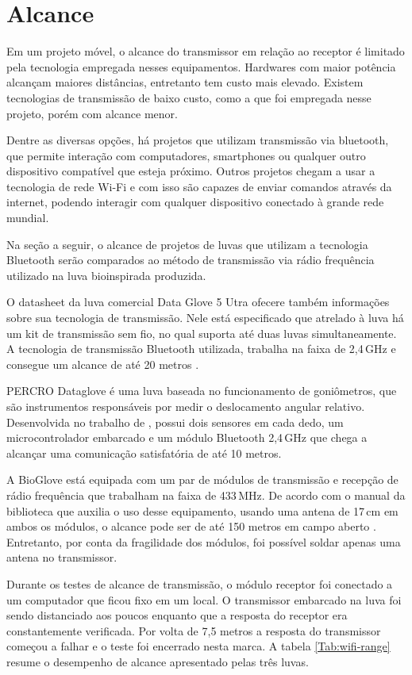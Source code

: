 \documentclass[
	12pt,				%
	openright,			%
	oneside,			%
	a4paper,			%
	english,			%
	brazil				%
	]{abntex2}
\begin{document}
			\section{Alcance}

			Em um projeto móvel, o alcance do transmissor em relação ao receptor é limitado pela tecnologia empregada nesses equipamentos. Hardwares com maior potência alcançam maiores distâncias, entretanto tem custo mais elevado. Existem tecnologias de transmissão de baixo custo, como a que foi empregada nesse projeto, porém com alcance menor. 
			
			Dentre as diversas opções, há projetos que utilizam transmissão via bluetooth, que permite interação com computadores, smartphones ou qualquer outro dispositivo compatível que esteja próximo. Outros projetos chegam a usar a tecnologia de rede Wi-Fi e com isso são capazes de enviar comandos através da internet, podendo interagir com qualquer dispositivo conectado à grande rede mundial. 

			Na seção a seguir, o alcance de projetos de luvas que utilizam a tecnologia Bluetooth serão comparados ao método de transmissão via rádio frequência utilizado na luva bioinspirada produzida.

			O datasheet da luva comercial Data Glove 5 Utra ofecere também informações sobre sua tecnologia de transmissão. Nele está especificado que atrelado à luva há um kit de transmissão sem fio, no qual suporta até duas luvas simultaneamente. A tecnologia de transmissão Bluetooth utilizada, trabalha na faixa de 2,4$\,$GHz e consegue um alcance de até 20 metros \cite{5DT-ultra}.

			PERCRO Dataglove é uma luva baseada no funcionamento de goniômetros, que são instrumentos responsáveis por medir o deslocamento angular relativo. Desenvolvida no trabalho de \cite{rodriguez2007goniometric}, possui dois sensores em cada dedo, um microcontrolador embarcado e um módulo Bluetooth 2,4$\,$GHz que chega a alcançar uma comunicação satisfatória de até 10 metros.

			A BioGlove está equipada com um par de módulos de transmissão e recepção de rádio frequência que trabalham na faixa de 433$\,$MHz. De acordo com o manual da biblioteca que auxilia o uso desse equipamento, usando uma antena de 17$\,$cm em ambos os módulos, o alcance pode ser de até 150 metros em campo aberto \cite{virtualwiremanual}. Entretanto, por conta da fragilidade dos módulos, foi possível soldar apenas uma antena no transmissor.

			Durante os testes de alcance de transmissão, o módulo receptor foi conectado a um computador que ficou fixo em um local. O transmissor embarcado na luva foi sendo distanciado aos poucos enquanto que a resposta do receptor era constantemente verificada. Por volta de 7,5 metros a resposta do transmissor começou a falhar e o teste foi encerrado nesta marca. A tabela \ref{Tab:wifi-range} resume o desempenho de alcance apresentado pelas três luvas.
\end{document}
